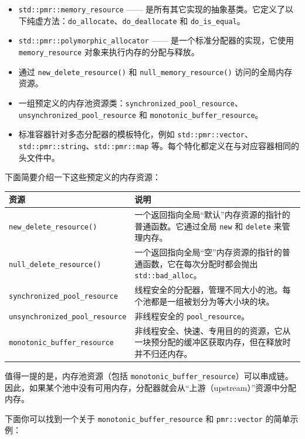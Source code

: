 \begin{itemize}
\item \texttt{std::pmr::memory\_resource} —— 是所有其它实现的抽象基类。它定义了以下纯虚方法：\texttt{do\_allocate}、\texttt{do\_deallocate} 和 \texttt{do\_is\_equal}。
\item \texttt{std::pmr::polymorphic\_allocator} —— 是一个标准分配器的实现，它使用 \texttt{memory\_resource} 对象来执行内存的分配与释放。
\item 通过 \texttt{new\_delete\_resource()} 和 \texttt{null\_memory\_resource()} 访问的全局内存资源。
\item 一组预定义的内存池资源类：\texttt{synchronized\_pool\_resource}、\texttt{unsynchronized\_pool\_resource} 和 \texttt{monotonic\_buffer\_resource}。
\item 标准容器针对多态分配器的模板特化，例如 \texttt{std::pmr::vector}、\texttt{std::pmr::string}、\texttt{std::pmr::map} 等。每个特化都定义在与对应容器相同的头文件中。
\end{itemize}

下面简要介绍一下这些预定义的内存资源：

\begin{table}[H]
\centering
\begin{tabularx}{\textwidth}{X X}
\toprule
资源 & 说明 \\
\midrule
\texttt{new\_delete\_resource()} & 一个返回指向全局“默认”内存资源的指针的普通函数。它通过全局 \texttt{new} 和 \texttt{delete} 来管理内存。 \\
\texttt{null\_delete\_resource()} & 一个返回指向全局“空”内存资源的指针的普通函数，它在每次分配时都会抛出 \texttt{std::bad\_alloc}。 \\
\texttt{synchronized\_pool\_resource} & 线程安全的分配器，管理不同大小的池。每个池都是一组被划分为等大小块的块。 \\
\texttt{unsynchronized\_pool\_resource} & 非线程安全的 \texttt{pool\_resource}。 \\
\texttt{monotonic\_buffer\_resource} & 非线程安全、快速、专用目的的资源，它从一块预分配的缓冲区获取内存，但在释放时并不归还内存。 \\
\bottomrule
\end{tabularx}
\end{table}

值得一提的是，内存池资源（包括 \texttt{monotonic\_buffer\_resource}）可以串成链。因此，如果某个池中没有可用内存，分配器就会从“上游（upstream）”资源中分配内存。

下面你可以找到一个关于 \texttt{monotonic\_buffer\_resource} 和 \texttt{pmr::vector} 的简单示例：

